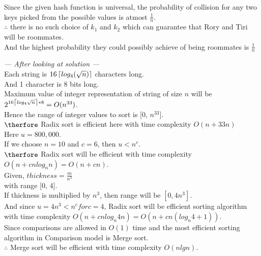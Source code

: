\documentclass[12pt,twoside]{article}
\begin{document}
\begin{problems}
\begin{problemparts}
\newpage
\problempart %
Since the given hash function is universal, the probability of collision for any two keys picked from the possible values is atmost $\frac{1}{n}$. \\

$\therefore$ there is no such choice of $k_1$ and $k_2$ which can guarantee that Rory and Tiri will be roommates. \\
And the highest probability they could possibly achieve of being roommates is $\frac{1}{n}$ 
\end{problemparts}

\newpage

\problem  %

\begin{problemparts}
\problempart %
\textit{--- After looking at solution ---} \\
Each string is $16\left\lceil log_4(\sqrt{n}) \right\rceil$ characters long. \\
And 1 character is 8 bits long. \\ 
Maximum value of integer representation of string of size $n$ will be $2^{16 \left\lceil log_4 \sqrt{n} \right\rceil * 8} = O(n^{33})$. \\
Hence the range of integer values to sort is [0, $n^{33}$]. \\
$\therfore$ Radix sort is efficient here with time complexity $O(n + 33 n)$ \\

\problempart %
Here $u = 800,000$. \\
If we choose $n = 10$ and $c = 6$, then $u < n^c$. \\
$\therfore$ Radix sort will be efficient with time complexity $O(n + cn log_n n) = O(n + cn)$. \\

\problempart %
Given, $thickness = \frac{m}{n^3}$ \\
with range [0, 4]. \\
If thickness is multiplied by $n^3$, then range will be $[0, 4n^3]$. \\
And since $u = 4n^3 < n^c for c = 4$, Radix sort will be efficient sorting algorithm with time complexity $O(n + c n log_n 4n) = O(n + c n (log_n4 + 1))$. \\

\problempart %
Since comparisons are allowed in $O(1)$ time and the most efficient sorting algorithm in Comparison model is Merge sort. \\
$\therefore$ Merge sort will be efficient with time complexity $O(nlgn)$.
\end{problemparts}
\newpage


\end{problems}
\end{document}
